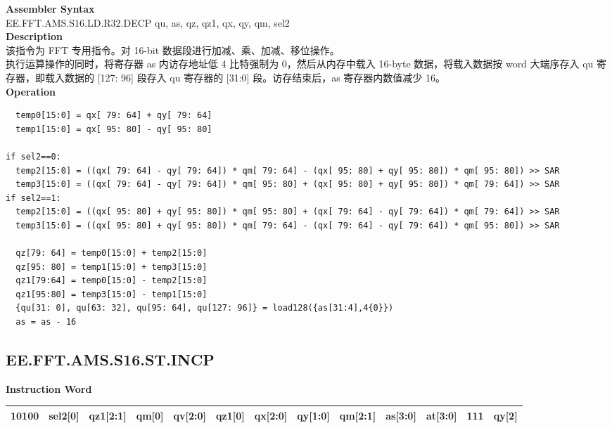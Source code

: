 \textbf{Assembler Syntax} \\
EE.FFT.AMS.S16.LD.R32.DECP qu, as, qz, qz1, qx, qy, qm, sel2 \\
\textbf{Description} \\
该指令为 FFT 专用指令。对 16-bit 数据段进行加减、乘、加减、移位操作。\\
执行运算操作的同时，将寄存器 as 内访存地址低 4 比特强制为 0，然后从内存中载入 16-byte 数据，将载入数据按 word 大端序存入 qu 寄存器，即载入数据的 [127: 96] 段存入 qu 寄存器的 [31:0] 段。访存结束后，as 寄存器内数值减少 16。\\
\textbf{Operation}
\begin{lstlisting}
  temp0[15:0] = qx[ 79: 64] + qy[ 79: 64]
  temp1[15:0] = qx[ 95: 80] - qy[ 95: 80]

if sel2==0:
  temp2[15:0] = ((qx[ 79: 64] - qy[ 79: 64]) * qm[ 79: 64] - (qx[ 95: 80] + qy[ 95: 80]) * qm[ 95: 80]) >> SAR
  temp3[15:0] = ((qx[ 79: 64] - qy[ 79: 64]) * qm[ 95: 80] + (qx[ 95: 80] + qy[ 95: 80]) * qm[ 79: 64]) >> SAR
if sel2==1:
  temp2[15:0] = ((qx[ 95: 80] + qy[ 95: 80]) * qm[ 95: 80] + (qx[ 79: 64] - qy[ 79: 64]) * qm[ 79: 64]) >> SAR
  temp3[15:0] = ((qx[ 95: 80] + qy[ 95: 80]) * qm[ 79: 64] - (qx[ 79: 64] - qy[ 79: 64]) * qm[ 95: 80]) >> SAR

  qz[79: 64] = temp0[15:0] + temp2[15:0]
  qz[95: 80] = temp1[15:0] + temp3[15:0]
  qz1[79:64] = temp0[15:0] - temp2[15:0]
  qz1[95:80] = temp3[15:0] - temp1[15:0]
  {qu[31: 0], qu[63: 32], qu[95: 64], qu[127: 96]} = load128({as[31:4],4{0}})
  as = as - 16
\end{lstlisting}

\clearpage
\subsection{EE.FFT.AMS.S16.ST.INCP}\label{instruction:EEFFTAMSS16STINCP}
\setlength\tabcolsep{6pt}
\textbf{Instruction Word} \\
\begin{tabular}{|c|c|c|c|c|c|c|c|c|c|c|c|c|}
	\hline
	10100 & sel2[0] & qz1[2:1] & qm[0] & qv[2:0] & qz1[0] & qx[2:0] & qy[1:0] & qm[2:1] & as[3:0] & at[3:0] & 111 & qy[2] \\
	\hline
\end{tabular}

